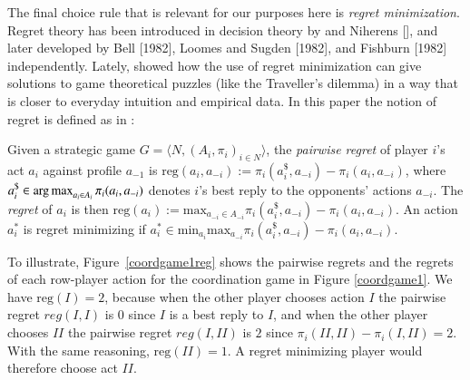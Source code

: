 \documentclass[fleqn,reqno,11pt]{article}
\begin{document}
The final choice rule that is relevant for our purposes here is \emph{regret
  minimization}. Regret theory has been introduced in decision theory by
\citet{Savage1951:The-theory-of-s} and Niherens [], and later developed by Bell [1982], Loomes
and Sugden [1982], and Fishburn [1982] independently. Lately,
\citet{HalpernPass2012:Iterated-Regret} showed how the use of regret minimization can give
solutions to game theoretical puzzles (like the Traveller's dilemma) in a way that is closer to
everyday intuition and empirical data. In this paper the notion of regret is defined as in
\citet{HalpernPass2012:Iterated-Regret}:

\begin{definition} \label{defn:regret} Given a strategic game
  $ G=\langle N, (A_i , \pi_i)_{i \in N} \rangle $, the \emph{pairwise regret} of player $i$'s
  act $a_i$ against profile $a_{-1}$ is
  $\text{reg}(a_i,a_{-i}):= \pi_i(a_i^\$,a_{-i})-\pi_i(a_i,a_{-i}) $, where
  $a_i^\$ \in \operatorname*{arg\,max}_{a_i \in A_i} \pi_i(a_i, a_{-i})$ denotes $i$'s best reply to the
  opponents' actions $a_{-i}$. The \emph{regret} of $a_i$ is then
  $\text{reg}(a_i):= \text{max}_{a_{-i}\in A_{-i}} \pi_i(a_i^\$,a_{-i})-\pi_i(a_i,a_{-i}) $. An
  action $a^{*}_i $ is regret minimizing if
  $a^{*}_i \in \text{min}_{a_i} \text{max}_{a_{-i}} \pi_i(a_i^\$,a_{-i})-\pi_i(a_i,a_{-i}) $.
\end{definition}


To illustrate, Figure~\ref{coordgame1reg} shows the pairwise regrets and the regrets of each
row-player action for the coordination game in Figure \ref{coordgame1}. We have
$\text{reg}(I)=2$, because when the other player chooses action $I$ the pairwise regret
$reg(I,I)$ is $0$ since $I$ is a best reply to $I$, and when the other player chooses $II$ the
pairwise regret $reg(I, II)$ is $2$ since $\pi_i(II,II)-\pi_i(I,II)=2$. With the same
reasoning, $\text{reg}(II)=1$. A regret minimizing player would therefore choose act $II$.
\end{document}
